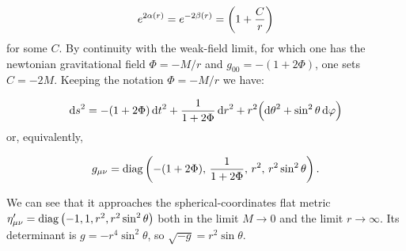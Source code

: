 \documentclass[main.tex]{subfiles}
\begin{document}
\begin{equation}
  e^{2 \alpha(r)} = e^{-2 \beta(r)} = \qty(1 + \frac{C}{r})
\end{equation}
for some \(C\). By continuity with the weak-field limit, for which one has the newtonian gravitational field \(\Phi = -M/r\) and \(g_{00} = - (1 + 2 \Phi)\), one sets \(C = -2M\).
Keeping the notation \(\Phi = -M/r\) we have:

\begin{equation}
    \dd{s}^2 = -(1+2\Phi)\dd{t}^2 + \frac{1}{1+2\Phi} \dd{r}^2
    + r^2 \qty(\dd{\theta}^2 + \sin^2\theta \dd{\varphi}) \label{eq:schwartzshild-line-element}
\end{equation}
or, equivalently,

\begin{equation}
    g_{\mu\nu} =  \diag\qty(-(1+2\Phi),\, \frac{1}{1+2\Phi},\, r^2,\, r^2 \sin ^2 \theta ) \,.
\end{equation}

We can see that it approaches the spherical-coordinates flat metric $\eta_{\mu\nu} ^{\prime} = \operatorname{diag}\qty(-1, 1, r^2, r^2 \sin ^2 \theta)$ both in the limit $M\rightarrow 0$ and the limit \(r \rightarrow \infty\). Its determinant is $g = -r^4 \sin^2 \theta$, so \(\sqrt{-g} = r^2 \sin \theta \).
\end{document}

